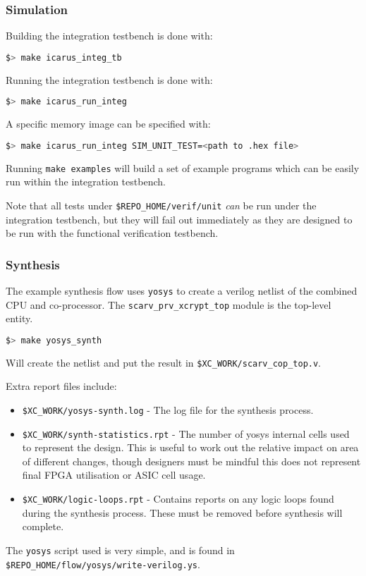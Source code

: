 \subsubsection{Simulation}

Building the integration testbench is done with:
\begin{lstlisting}[language=bash]  
$> make icarus_integ_tb
\end{lstlisting}

Running the integration testbench is done with:

\begin{lstlisting}[language=bash]
$> make icarus_run_integ
\end{lstlisting}

A specific memory image can be specified with:

\begin{lstlisting}[language=bash]
$> make icarus_run_integ SIM_UNIT_TEST=<path to .hex file>
\end{lstlisting}

Running {\tt make examples} will build a set of example programs which can
be easily run within the integration testbench.

Note that all tests under {\tt \$REPO\_HOME/verif/unit} {\em can} be run
under the integration testbench, but they will fail out immediately
as they are designed to be run with the functional verification testbench.

\subsubsection{Synthesis}

The example synthesis flow uses {\tt yosys} to create a verilog netlist of
the combined CPU and co-processor.
The {\tt scarv\_prv\_xcrypt\_top} module is the top-level entity.

\begin{lstlisting}[language=bash]
$> make yosys_synth
\end{lstlisting}

\noindent
Will create the netlist and put the result in 
{\tt \$XC\_WORK/scarv\_cop\_top.v}.

\noindent
Extra report files include:
\begin{itemize}
\item {\tt \$XC\_WORK/yosys-synth.log} - 
    The log file for the synthesis process.
\item {\tt \$XC\_WORK/synth-statistics.rpt} - 
    The number of yosys internal cells used to represent the design.
    This is useful to work out the relative impact on area of different
    changes, though designers must be mindful this does not represent
    final FPGA utilisation or ASIC cell usage.
\item {\tt \$XC\_WORK/logic-loops.rpt} - 
    Contains reports on any logic loops found during the synthesis process.
    These must be removed before synthesis will complete.
\end{itemize}

\noindent
The {\tt yosys} script used is very simple, and is found in
{\tt \$REPO\_HOME/flow/yosys/write-verilog.ys}.
